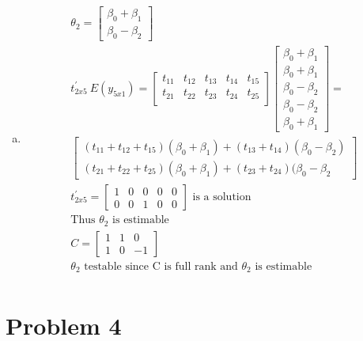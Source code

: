 \documentclass{article}
\newcommand{\B}{\beta}
\begin{document}
\begin{flushleft}
\begin{enumerate}[(a)]
\pagebreak

	\item 
\begin{multline*}\\
\theta_2=\left[\begin{array}{r}
\B_0+\B_1\\
\B_0-\B_2
\end{array}\right]\\
t^{'}_{2x5} \ E(y_{5x1})=\left[\begin{array}{rrrrr}
t_{11}&t_{12}&t_{13}&t_{14}&t_{15}\\
t_{21}&t_{22}&t_{23}&t_{24}&t_{25}\\
\end{array}\right]\left[\begin{array}{r}
\B_0+\B_1\\
\B_0+\B_1\\
\B_0-\B_2\\
\B_0-\B_2\\
\B_0+\B_1
\end{array}\right]=\\
\left[\begin{array}{r}
(t_{11}+t_{12}+t_{15})(\B_0+\B_1)+(t_{13}+t_{14})(\B_0-\B_2)\\
(t_{21}+t_{22}+t_{25})(\B_0+\B_1)+(t_{23}+t_{24})(\B_0-\B_2\end{array} \right]\\
t^{'}_{2x5}=\left[\begin{array}{rrrrr}
1&0&0&0&0\\
0&0&1&0&0
\end{array}\right] \text{ is a solution}\\
\text{Thus } \theta_2 \text{ is estimable}\\
C=\left[\begin{array}{rrr}
1&1&0\\
1&0&-1
\end{array}\right]\\
\theta_2 \text{  testable since C is full rank and } \theta_2 \text{ is estimable}\\
\end{multline*}

\end{enumerate}

	\section*{Problem 4}
	
\begin{enumerate}[(a)]
	

\end{enumerate}
\end{flushleft}
\end{document}
